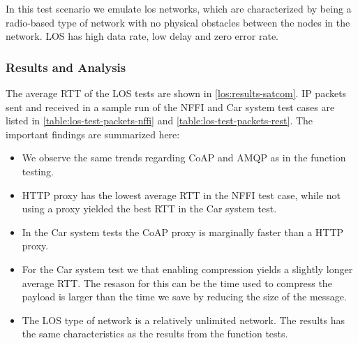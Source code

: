 In this test scenario we emulate \gls{los} networks, which are characterized by
being a radio-based type of network with no physical obstacles between the nodes
in the network. LOS has high data rate, low delay and zero error rate.

\subsubsection{Results and Analysis}

The average RTT of the LOS tests are shown in \cref{los:results-satcom}. IP
packets sent and received in a sample run of the NFFI and Car system test cases
are listed in \cref{table:los-test-packets-nffi} and
\cref{table:los-test-packets-rest}. The important findings are summarized here:

\begin{itemize}

    \item We observe the same trends regarding CoAP and AMQP as in the function
    testing.

    \item HTTP proxy has the lowest average RTT in the NFFI test case, while not
    using a proxy yielded the best RTT in the Car system test.

    \item In the Car system tests the CoAP proxy is marginally faster than a
    HTTP proxy.

    \item For the Car system test we that enabling compression yields a slightly
    longer average RTT. The resason for this can be the time used to compress
    the payload is larger than the time we save by reducing the size of the
    message.

    \item The LOS type of network is a relatively unlimited network. The results
    has the same characteristics as the results from the function tests.

\end{itemize}



